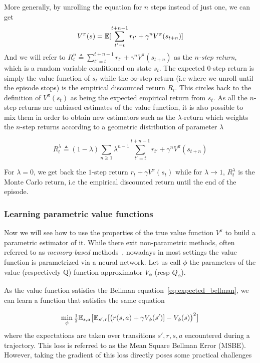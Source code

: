 More generally, by unrolling the equation for $n$ steps instead of just one, we can get
\begin{equation}
      V^\pi(s)  = \mathbb{E} [\sum_{t'=t}^{t+n-1} r_{t'} + \gamma^n V^\pi(s_{t+n})]
\end{equation}
And we will refer to $R^{n}_t \triangleq \sum_{t'=t}^{t+n-1} r_{t'} + \gamma^n
V^\pi(s_{t+n})$ as the \emph{$n$-step return}, which is a random variable
conditioned on state $s_t$. The expected $0$-step return is simply the value function of $s_t$ while the $\infty$-step return (i.e where we unroll until the episode stops) is the empirical discounted return $R_t$. This circles back to the definition of $V^\pi(s_t)$ as being the expected empirical return from $s_t$. As all the $n$-step returns are unbiased estimates of the value function, it is also possible to mix them in order to obtain new estimators such as the $\lambda$-return which weights the $n$-step returns according to a geometric distribution of parameter $\lambda$

\begin{equation}
\label{eq:lambda_return}
    R^\lambda_t \triangleq (1-\lambda) \sum_{n \ge 1} \lambda^{n-1} \sum_{t'=t}^{t+n-1} r_{t'} + \gamma^n V^\pi(s_{t+n})
\end{equation}

For $\lambda=0$, we get back the $1$-step return $r_t + \gamma V^\pi(s_t)$ while for $\lambda \to 1$, $R^\lambda_t$ is the Monte Carlo return, i.e the empirical discounted return until the end of the episode.


\subsubsection{Learning parametric value functions}
\label{subsec:td}

Now we will see how to use the properties of the true value function $V^\pi$ to build a parametric estimator of it. While there exit non-parametric methods, often referred to as \emph{memory-based} methods~\citep{atkeson1997locally}, nowadays in most settings the value function is parametrized via a neural network. Let us call $\phi$ the parameters of the value (respectively Q) function approximator $V_\phi$ (resp $Q_\phi$).

As the value function satisfies the Bellman equation~\cref{eq:expected_bellman}, we can learn a function that satisfies the same equation

\begin{equation}
\label{eq:MSBE}
    \min_\phi \tfrac{1}{2} \mathbb{E}_{s, a} \big[ \mathbb{E}_{s', r}[ \big( r(s,a) + \gamma V_\phi(s')] - V_\phi(s) \big)^2\big]
\end{equation}
where the expectations are taken over transitions $s', r, s, a$ encountered during a trajectory. This loss is referred to as the Mean Square Bellman Error (MSBE). %
However, taking the gradient of this loss directly poses some practical challenges

